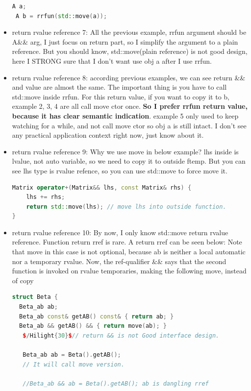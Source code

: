 \documentclass[a4paper,12pt,twoside]{book}
\begin{document}
\begin{itemize}
\begin{lstlisting}[frame=single, language=c++]
 A a;
 A b = rrfun(std::move(a));
\end{lstlisting}

\item return rvalue reference 7: All the previous example, rrfun argument should be A\&\& arg,  I just focus on return part, so I simplify the argument to a plain reference. But you should know, std::move(plain reference) is not good design, here I STRONG sure that I don't want use obj a after I use rrfun.

\item return rvalue reference 8: according previous examples, we can see return \&\& and value are almost the same. The important thing is you have to call std::move inside rrfun.  For this return value, if you want to copy it to b,  example 2, 3, 4 are all call move ctor once. \textbf{So I prefer rrfun return value, because it has clear semantic indication}. example 5 only used to keep watching for a while, and not call move ctor so obj a is still intact. I don't see any practical application context right now, just know about it.

\item return rvalue reference 9: Why we use move in below example? lhs inside is lvalue, not auto variable,  so we need to copy it to outside ftemp. But you can see lhs type is rvalue refence, so you can use std::move to force move it.
\begin{lstlisting}[frame=single, language=c++]
Matrix operator+(Matrix&& lhs, const Matrix& rhs) {
    lhs += rhs;
    return std::move(lhs); // move lhs into outside function.
}
\end{lstlisting}

\item return rvalue reference 10:   By now, I only know std::move return rvalue reference.  Function return rref is rare. A return rref can be seen below:  Note that move in this case is not optional, because ab is neither a local automatic nor a temporary rvalue. Now, the ref-qualifier \&\& says that the second function is invoked on rvalue temporaries, making the following move, instead of copy
\begin{lstlisting}[frame=single, language=c++]
struct Beta {
  Beta_ab ab;
  Beta_ab const& getAB() const& { return ab; }
  Beta_ab && getAB() && { return move(ab); }
   $/Hilight{30}$// return && is not Good interface design.

   Beta_ab ab = Beta().getAB();
   // It will call move version.

   //Beta_ab && ab = Beta().getAB(); ab is dangling rref


\end{lstlisting}
\end{itemize}
\end{document}
